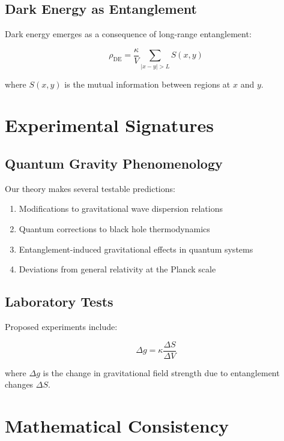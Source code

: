 \documentclass[12pt,a4paper]{article}
\begin{document}
\subsection{Dark Energy as Entanglement}

Dark energy emerges as a consequence of long-range entanglement:

\begin{equation}
\rho_{\text{DE}} = \frac{\kappa}{V} \sum_{|x-y| > L} S(x,y)
\end{equation}

where $S(x,y)$ is the mutual information between regions at $x$ and $y$.

\section{Experimental Signatures}

\subsection{Quantum Gravity Phenomenology}

Our theory makes several testable predictions:

\begin{enumerate}
\item Modifications to gravitational wave dispersion relations
\item Quantum corrections to black hole thermodynamics
\item Entanglement-induced gravitational effects in quantum systems
\item Deviations from general relativity at the Planck scale
\end{enumerate}

\subsection{Laboratory Tests}

Proposed experiments include:

\begin{equation}
\Delta g = \kappa \frac{\Delta S}{\Delta V}
\end{equation}

where $\Delta g$ is the change in gravitational field strength due to entanglement changes $\Delta S$.

\section{Mathematical Consistency}
\end{document}

